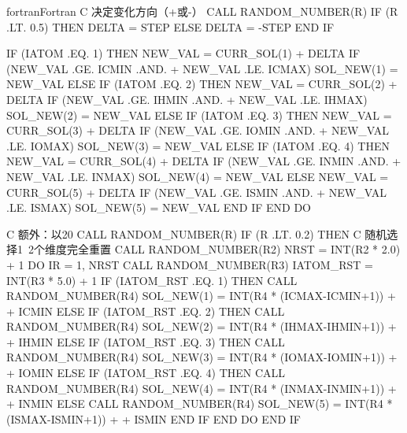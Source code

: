 \begin{envcode}{fortran}{Fortran}
C                 决定变化方向（+或-）
                  CALL RANDOM_NUMBER(R)
                  IF (R .LT. 0.5) THEN
                      DELTA = STEP
                  ELSE
                      DELTA = -STEP
                  END IF
                  
                  IF (IATOM .EQ. 1) THEN
                      NEW_VAL = CURR_SOL(1) + DELTA
                      IF (NEW_VAL .GE. ICMIN .AND.
     +                    NEW_VAL .LE. ICMAX) SOL_NEW(1) = NEW_VAL
                  ELSE IF (IATOM .EQ. 2) THEN
                      NEW_VAL = CURR_SOL(2) + DELTA
                      IF (NEW_VAL .GE. IHMIN .AND.
     +                    NEW_VAL .LE. IHMAX) SOL_NEW(2) = NEW_VAL
                  ELSE IF (IATOM .EQ. 3) THEN
                      NEW_VAL = CURR_SOL(3) + DELTA
                      IF (NEW_VAL .GE. IOMIN .AND.
     +                    NEW_VAL .LE. IOMAX) SOL_NEW(3) = NEW_VAL
                  ELSE IF (IATOM .EQ. 4) THEN
                      NEW_VAL = CURR_SOL(4) + DELTA
                      IF (NEW_VAL .GE. INMIN .AND.
     +                    NEW_VAL .LE. INMAX) SOL_NEW(4) = NEW_VAL
                  ELSE
                      NEW_VAL = CURR_SOL(5) + DELTA
                      IF (NEW_VAL .GE. ISMIN .AND.
     +                    NEW_VAL .LE. ISMAX) SOL_NEW(5) = NEW_VAL
                  END IF
              END DO
              
C             额外：以20%
              CALL RANDOM_NUMBER(R)
              IF (R .LT. 0.2) THEN
C                 随机选择1~2个维度完全重置
                  CALL RANDOM_NUMBER(R2)
                  NRST = INT(R2 * 2.0) + 1
                  DO IR = 1, NRST
                      CALL RANDOM_NUMBER(R3)
                      IATOM_RST = INT(R3 * 5.0) + 1
                      IF (IATOM_RST .EQ. 1) THEN
                          CALL RANDOM_NUMBER(R4)
                          SOL_NEW(1) = INT(R4 * (ICMAX-ICMIN+1)) 
     +                               + ICMIN
                      ELSE IF (IATOM_RST .EQ. 2) THEN
                          CALL RANDOM_NUMBER(R4)
                          SOL_NEW(2) = INT(R4 * (IHMAX-IHMIN+1)) 
     +                               + IHMIN
                      ELSE IF (IATOM_RST .EQ. 3) THEN
                          CALL RANDOM_NUMBER(R4)
                          SOL_NEW(3) = INT(R4 * (IOMAX-IOMIN+1)) 
     +                               + IOMIN
                      ELSE IF (IATOM_RST .EQ. 4) THEN
                          CALL RANDOM_NUMBER(R4)
                          SOL_NEW(4) = INT(R4 * (INMAX-INMIN+1)) 
     +                               + INMIN
                      ELSE
                          CALL RANDOM_NUMBER(R4)
                          SOL_NEW(5) = INT(R4 * (ISMAX-ISMIN+1)) 
     +                               + ISMIN
                      END IF
                  END DO
              END IF
              

\end{envcode}
